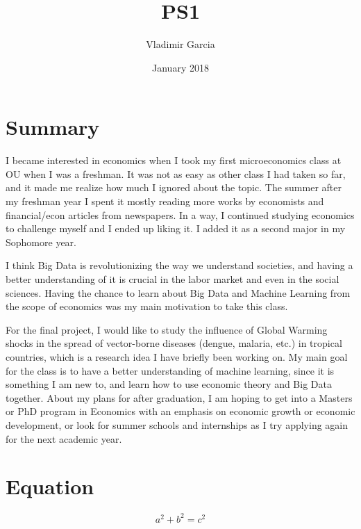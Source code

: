 \documentclass{article}
\title{PS1}
\author{Vladimir Garcia}
\date{January 2018}
\begin{document}
\maketitle

\section{Summary}
I became interested in economics when I took my first microeconomics class at OU when I was a freshman. It was not as easy as other class I had taken so far, and it made me realize how much I ignored about the topic. The summer after my freshman year I spent it mostly reading more works by economists and financial/econ articles from newspapers. In a way, I continued studying economics to challenge myself and I ended up liking it. I added it as a second major in my Sophomore year. 

I think Big Data is revolutionizing the way we understand societies, and having a better understanding of it is crucial in the labor market and even in the social sciences. Having the chance to learn about Big Data and Machine Learning from the scope of economics was my main motivation to take this class. 

For the final project, I would like to study the influence of Global Warming shocks in the spread of vector-borne diseases (dengue, malaria, etc.) in tropical countries, which is a research idea I have briefly been working on. My main goal for the class is to have a better understanding of machine learning, since it is something I am new to, and learn how to use economic theory and Big Data together. About my plans for after graduation, I am hoping to get into a Masters or PhD program in Economics with an emphasis on economic growth or economic development, or look for summer schools and internships as I try applying again for the next academic year. 

\section{Equation}
\begin{equation}
    a^2+b^2=c^2
\end{equation}
\end{document}
